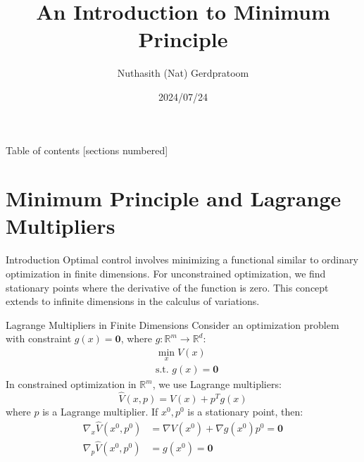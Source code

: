 \documentclass[10pt]{beamer}
\title{An Introduction to Minimum Principle}
\date{2024/07/24}
\author{Nuthasith (Nat) Gerdpratoom}
\institute{Control \& Optimization Laboratory}
\begin{document}
\maketitle

\begin{frame}{Table of contents}
  [sections numbered]
  \tableofcontents%
\end{frame}

\section{Minimum Principle and Lagrange Multipliers}

\begin{frame}{Introduction}
  Optimal control involves minimizing a functional similar to ordinary optimization in finite dimensions. For unconstrained optimization, we find stationary points where the derivative of the function is zero. This concept extends to infinite dimensions in the calculus of variations.
\end{frame}

\begin{frame}{Lagrange Multipliers in Finite Dimensions}
  Consider an optimization problem with constraint \( g(x) = \mathbf{0} \), where \(g:\mathbb{R}^{m}\rightarrow \mathbb{R}^{d}\):
  \[
    \begin{aligned}
      &\underset{x}{\min}V(x) \\
      &\text{s.t. } g(x) = \mathbf{0}
    \end{aligned}
  \]
  In constrained optimization in \( \mathbb{R}^m \), we use Lagrange multipliers:
  \[
  \hat{V}(x, p) = V(x) + p^T g(x)
  \]
  where \( p \) is a Lagrange multiplier. If \( x^0, p^0 \) is a stationary point, then:
  \[
  \begin{aligned}
    \nabla_x \hat{V}(x^0, p^0) &= \nabla V(x^0) + \nabla g(x^0) p^0 = \mathbf{0}\\
    \nabla_p \hat{V}(x^0, p^0) &= g(x^0) = \mathbf{0}
  \end{aligned}
  \]
  \end{frame}
\end{document}
